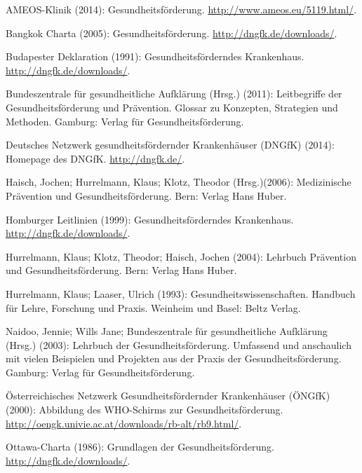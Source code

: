 \begin{thebibliography}{99}

	AMEOS-Klinik (2014): Gesundheitsförderung. \url{http://www.ameos.eu/5119.html/}.

	Bangkok Charta (2005): Gesundheitsförderung. \url{http://dngfk.de/downloads/}.
	
	Budapester Deklaration (1991): Gesundheitsförderndes Krankenhaus. \url{http://dngfk.de/downloads/}.
	
	Bundeszentrale für gesundheitliche Aufklärung (Hrsg.) (2011): Leitbegriffe der Gesundheitsförderung und Prävention. Glossar zu Konzepten, Strategien und Methoden. Gamburg: Verlag für Gesundheitsförderung.
	
	Deutsches Netzwerk gesundheitsfördernder Krankenhäuser (DNGfK) (2014): Homepage des DNGfK. \url{http://dngfk.de/}.
	
	Haisch, Jochen; Hurrelmann, Klaus; Klotz, Theodor (Hrsg.)(2006): Medizinische Prävention und Gesundheitsförderung. Bern: Verlag Hans Huber.
	
	Homburger Leitlinien (1999): Gesundheitsförderndes Krankenhaus. \url{http://dngfk.de/downloads/}.
	
	Hurrelmann, Klaus; Klotz, Theodor; Haisch, Jochen (2004): Lehrbuch Prävention und Gesundheitsförderung. Bern: Verlag Hans Huber.
	
	Hurrelmann, Klaus; Laaser, Ulrich (1993): Gesundheitswissenschaften. Handbuch für Lehre, Forschung und Praxis. Weinheim und Basel: Beltz Verlag.

	Naidoo, Jennie; Wills Jane; Bundeszentrale für gesundheitliche Aufklärung (Hrsg.) (2003): Lehrbuch der Gesundheitsförderung. Umfassend und anschaulich mit vielen Beispielen und Projekten aus der Praxis der Gesundheitsförderung. Gamburg: Verlag für Gesundheitsförderung.
	
	Österreichisches Netzwerk Gesundheitsfördernder Krankenhäuser (ÖNGfK) (2000): Abbildung des WHO-Schirms zur Gesundheitsförderung. \url{http://oengk.univie.ac.at/downloads/rb-alt/rb9.html/}.
	
	Ottawa-Charta (1986): Grundlagen der Gesundheitsförderung. \url{http://dngfk.de/downloads/}.
	

\end{thebibliography}
